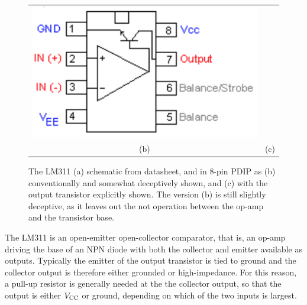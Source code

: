 \documentclass[12pt]{article}
\begin{document}
\begin{figure}[thbp]
\begin{center}
\begin{tabular}{cc}
{\includegraphics[height=0.2\textheight]{figs/LM311-trans.png}} \\
(b) & (c) \\
\end{tabular}
\caption{\label{fig:lm311} The LM311 (a) schematic from datasheet, and in 8-pin PDIP as (b) conventionally and somewhat deceptively shown, and (c) with the output transistor explicitly shown.  The version (b) is still slightly deceptive, as it leaves out the not operation between the op-amp and the transistor base.}
\end{center}
\end{figure}


The LM311 is an open-emitter open-collector comparator, that is, an op-amp driving the base of an NPN diode with both the collector and emitter available as outputs.   Typically the emitter of the output transistor is tied to ground and the collector output is therefore either grounded or high-impedance.  For this reason, a pull-up resistor is generally needed at the the collector output, so that the output is either $V_{\rm CC}$ or ground, depending on which of the two inputs is largest.
\end{document}
